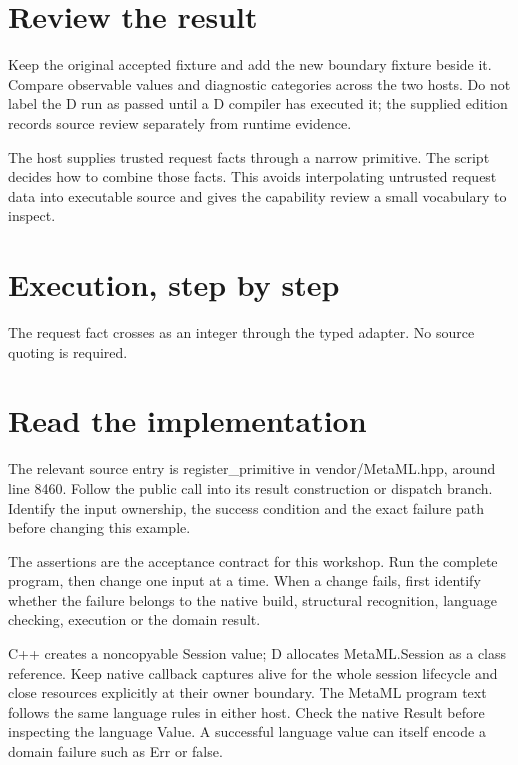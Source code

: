 \section*{Review the result}
Keep the original accepted fixture and add the new boundary fixture beside it. Compare observable values and diagnostic categories across the two hosts. Do not label the D run as passed until a D compiler has executed it; the supplied edition records source review separately from runtime evidence.

\clearpage
{}
The host supplies trusted request facts through a narrow primitive. The script decides how to combine those facts. This avoids interpolating untrusted request data into executable source and gives the capability review a small vocabulary to inspect.


\section*{Execution, step by step}
The request fact crosses as an integer through the typed adapter. No source quoting is required.

\section*{Read the implementation}
The relevant source entry is register\_primitive in vendor/MetaML.hpp, around line 8460. Follow the public call into its result construction or dispatch branch. Identify the input ownership, the success condition and the exact failure path before changing this example.

The assertions are the acceptance contract for this workshop. Run the complete program, then change one input at a time. When a change fails, first identify whether the failure belongs to the native build, structural recognition, language checking, execution or the domain result.

\clearpage
{}
C++ creates a noncopyable Session value; D allocates MetaML.Session as a class reference. Keep native callback captures alive for the whole session lifecycle and close resources explicitly at their owner boundary. The MetaML program text follows the same language rules in either host. Check the native Result before inspecting the language Value. A successful language value can itself encode a domain failure such as Err or false.

